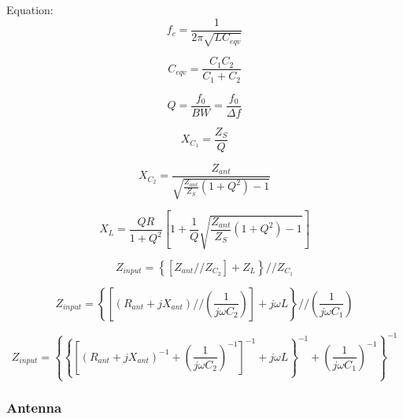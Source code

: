                 Equation:
                \begin{equation}
                    f_c = \frac{1}{2\pi\sqrt{LC_{eqv}}}
                \end{equation}

                \begin{equation}
                    C_{eqv} = \frac{C_1C_2}{C_1 + C_2}
                \end{equation}

                \begin{equation}
                    Q = \frac{f_0}{BW} = \frac{f_0}{\Delta f}
                \end{equation}

                \begin{equation}
                    X_{C_1} = \frac{Z_S}{Q}
                \end{equation}

                \begin{equation}
                    X_{C_2} = \frac{Z_{ant}}{\sqrt{\frac{Z_{ant}}{Z_S}\left(1+Q^2\right) - 1}}
                \end{equation}

                \begin{equation}
                    X_L = \frac{QR}{1+Q^2}\left[1 + \frac{1}{Q}\sqrt{\frac{Z_{ant}}{Z_S}\left(1+Q^2\right)-1}\right]
                \end{equation}

                \begin{equation}
                    Z_{input} = \left\{\left[Z_{ant} // Z_{C_2}\right] + Z_L\right\} // Z_{C_1}
                \end{equation}

                
                \begin{equation}
                    Z_{input} = \left\{\left[\left(R_{ant}+jX_{ant}\right) // \left(\frac{1}{j\omega C_2}\right)\right] + j\omega L\right\} // \left(\frac{1}{j\omega C_1}\right)
                \end{equation}

                \begin{equation}
                    Z_{input} = \left\{\left\{\left[\left(R_{ant}+jX_{ant}\right)^{-1} + \left(\frac{1}{j\omega C_2}\right)^{-1}\right]^{-1} + j\omega L\right\}^{-1} + \left(\frac{1}{j\omega C_1}\right)^{-1}\right\}^{-1}
                \end{equation}
            \subsubsection{Antenna}
